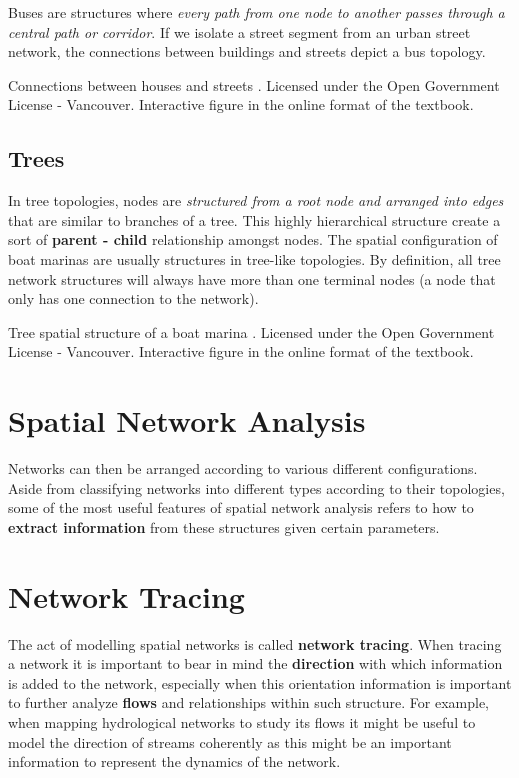 \documentclass[
]{book}
\begin{document}
Buses are structures where \emph{every path from one node to another passes through a central path or corridor}. If we isolate a street segment from an urban street network, the connections between buildings and streets depict a bus topology.

\label{fig:8-connections-houses-streets}Connections between houses and streets \citep{city_of_vancouver_open_nodate}. Licensed under the Open Government License - Vancouver. Interactive figure in the online format of the textbook.

\subsection{Trees}\label{trees}

In tree topologies, nodes are \emph{structured from a root node and arranged into edges} that are similar to branches of a tree. This highly hierarchical structure create a sort of \textbf{parent - child} relationship amongst nodes. The spatial configuration of boat marinas are usually structures in tree-like topologies. By definition, all tree network structures will always have more than one terminal nodes (a node that only has one connection to the network).

\label{fig:8-boat-marina}Tree spatial structure of a boat marina \citep{city_of_vancouver_open_nodate}. Licensed under the Open Government License - Vancouver. Interactive figure in the online format of the textbook.

\section{Spatial Network Analysis}\label{spatial-network-analysis}

Networks can then be arranged according to various different configurations. Aside from classifying networks into different types according to their topologies, some of the most useful features of spatial network analysis refers to how to \textbf{extract information} from these structures given certain parameters.

\section{Network Tracing}\label{network-tracing}

The act of modelling spatial networks is called \textbf{network tracing}. When tracing a network it is important to bear in mind the \textbf{direction} with which information is added to the network, especially when this orientation information is important to further analyze \textbf{flows} and relationships within such structure. For example, when mapping hydrological networks to study its flows it might be useful to model the direction of streams coherently as this might be an important information to represent the dynamics of the network.
\end{document}

